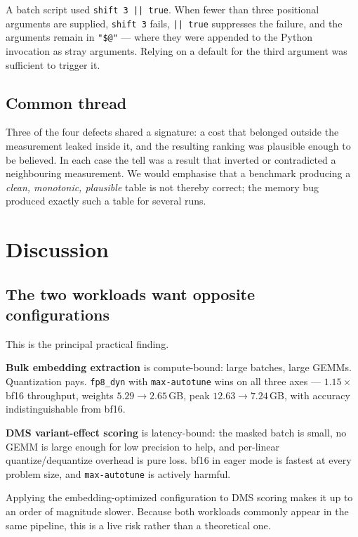 \documentclass[11pt]{article}
\newcommand{\cfg}[1]{\texttt{#1}}
\begin{document}
A batch script used \texttt{shift 3 || true}. When fewer than three positional
arguments are supplied, \texttt{shift 3} fails, \texttt{|| true} suppresses the
failure, and the arguments remain in \texttt{"\$@"} --- where they were appended
to the Python invocation as stray arguments. Relying on a default for the third
argument was sufficient to trigger it.

\subsection{Common thread}

Three of the four defects shared a signature: a cost that belonged outside the
measurement leaked inside it, and the resulting ranking was plausible enough to
be believed. In each case the tell was a result that inverted or contradicted a
neighbouring measurement. We would emphasise that a benchmark producing a
\emph{clean, monotonic, plausible} table is not thereby correct; the memory bug
produced exactly such a table for several runs.

\section{Discussion}

\subsection{The two workloads want opposite configurations}
\label{sec:opposite}

This is the principal practical finding.

\textbf{Bulk embedding extraction} is compute-bound: large batches, large GEMMs.
Quantization pays. \cfg{fp8\_dyn} with \texttt{max-autotune} wins on all three
axes --- $1.15\times$ bf16 throughput, weights $5.29 \to 2.65$\,GB, peak
$12.63 \to 7.24$\,GB, with accuracy indistinguishable from bf16.

\textbf{DMS variant-effect scoring} is latency-bound: the masked batch is small,
no GEMM is large enough for low precision to help, and per-linear
quantize/dequantize overhead is pure loss. bf16 in eager mode is fastest at
every problem size, and \texttt{max-autotune} is actively harmful.

Applying the embedding-optimized configuration to DMS scoring makes it up to an
order of magnitude slower. Because both workloads commonly appear in the same
pipeline, this is a live risk rather than a theoretical one.
\end{document}
